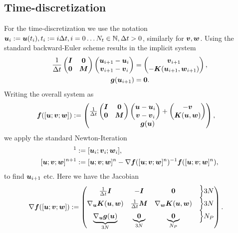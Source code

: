 \subsection{Time-discretization}
For the time-discretization we use the notation $\vu_i := \vu(t_i), t_i := i\Delta t, i=0\ldots N_t\in\N, \Delta t > 0$, similarly for $\vv,\vw$.
Using the standard backward-Euler scheme results in the implicit system
\begin{align}
	\frac{1}{\Delta t}\m{\vI & \vnull\\ \vnull & \vM}\m{\vu_{i+1}-\vu_i\\\vv_{i+1}-\vv_i} &= \m{\vv_{i+1}\\-\vK(\vu_{i+1},\vw_{i+1})},\\
	\vg(\vu_{i+1})		&= \vnull.
\end{align}
Writing the overall system as 
\begin{align}
	\vf([\vu; \vv; \vw]) &:= \m{\frac{1}{\Delta t}\m{\vI & \vnull\\ \vnull & \vM}\m{\vu-\vu_i\\\vv-\vv_i} + \m{-\vv\\\vK(\vu,\vw)}\\
		\vg(\vu)},
\end{align}
we apply the standard Newton-Iteration
\begin{align}
	[\vu; \vv; \vw]^1 &:= [\vu_i; \vv_i; \vw_i],\\
	[\vu; \vv; \vw]^{n+1} &:= [\vu; \vv; \vw]^{n} - \nabla \vf([\vu; \vv; \vw]^n)^{-1}\vf([\vu; \vv; \vw]^n), 
\end{align}
to find $\vu_{i+1}$ etc.
Here we have the Jacobian
\begin{align}
	 \nabla \vf([\vu; \vv; \vw]) &:= \m{\frac{1}{\Delta t} \vI & -\vI & \vnull & \Bigl\rbrace3N\\
	 									\nabla_{\vu}\vK(\vu,\vw) & \frac{1}{\Delta t}\vM & \nabla_{\vw}\vK(\vu,\vw) & \Bigl\rbrace3N\\
	 									\underbrace{\nabla_{\vu}\vg(\vu)}_{3N} & \underbrace{\vnull}_{3N} & \underbrace{\vnull}_{N_P} & \Bigl\rbrace N_P}.
\end{align}

